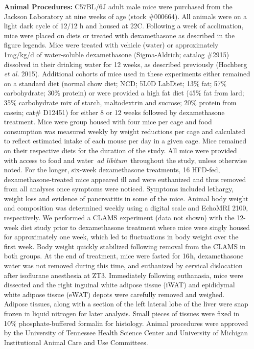 \documentclass[11pt]{article} %
\begin{document}
\textbf{Animal Procedures:} C57BL/6J adult male mice were purchased from
the Jackson Laboratory at nine weeks of age (stock \#000664). All
animals were on a light dark cycle of 12/12 h and housed at 22\degree C.
Following a week of acclimation, mice were placed on diets or treated
with dexamethasone as described in the figure legends. Mice were treated
with vehicle (water) or approximately 1mg/kg/d of water-soluble
dexamethasone (Sigma-Aldrich; catalog \#2915) dissolved in their
drinking water for 12 weeks, as described previously (Hochberg \emph{et
al.} 2015). Additional cohorts of mice used in these experiments either
remained on a standard diet (normal chow diet; NCD; 5L0D LabDiet; 13\%
fat; 57\% carbohydrate; 30\% protein) or were provided a high fat diet
(45\% fat from lard; 35\% carbohydrate mix of starch, maltodextrin and
sucrose; 20\% protein from casein; cat\# D12451) for either 8 or 12
weeks followed by dexamethasone treatment. Mice were group housed with
four mice per cage and food consumption was measured weekly by weight
reductions per cage and calculated to reflect estimated intake of each
mouse per day in a given cage. Mice remained on their respective diets
for the duration of the study. All mice were provided with access to
food and water~\emph{ad libitum}~throughout the study, unless otherwise
noted. For the longer, six-week dexamethasone treatments, 16 HFD-fed,
dexamethasone-treated mice appeared ill and were euthanized and thus
removed from all analyses once symptoms were noticed. Symptoms included
lethargy, weight loss and evidence of pancreatitis in some of the mice.
Animal body weight and composition was determined weekly using a digital
scale and EchoMRI 2100, respectively. We performed a CLAMS experiment
(data not shown) with the 12-week diet study prior to dexamethasone
treatment where mice were singly housed for approximately one week,
which led to fluctuations in body weight over the first week. Body
weight quickly stabilized following removal from the CLAMS in both
groups. At the end of treatment, mice were fasted for 16 h,
dexamethasone water was not removed during this time, and euthanized by
cervical dislocation after isoflurane anesthesia at ZT3. Immediately
following euthanasia, mice were dissected and the right inguinal white
adipose tissue (iWAT) and epididymal white adipose tissue (eWAT) depots
were carefully removed and weighed. Adipose tissues, along with a
section of the left lateral lobe of the liver were snap frozen in liquid
nitrogen for later analysis. Small pieces of tissues were fixed in 10\%
phosphate-buffered formalin for histology. Animal procedures were
approved by the University of Tennessee Health Science Center and
University of Michigan Institutional Animal Care and Use Committees.
\end{document}
